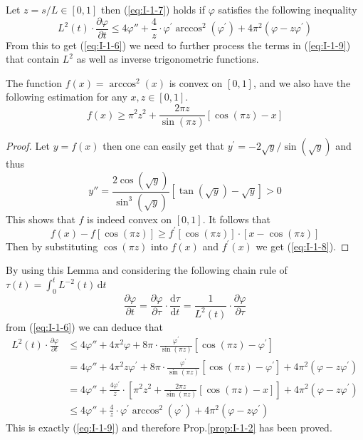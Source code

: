 Let $z=s/L\in[0,1]$ then (\ref{eq:I-1-7}) holds if $\varphi$ satisfies the following inequality
\begin{equation}\label{eq:I-1-9}
    L^2(t)\cdot\frac{\partial\varphi}{\partial t}\le 4\varphi{''}+\frac{4}{z}\cdot\varphi^\prime\arccos^2{(\varphi^\prime)}+4\pi^2(\varphi-z\varphi^\prime)
\end{equation}
From this to get (\ref{eq:I-1-6}) we need to further process the terms in (\ref{eq:I-1-9}) that contain $L^2$ as well as inverse trigonometric functions.
\begin{lemma}\label{lem:I-1-6}
    The function $f(x)=\arccos^2{(x)}$ is convex on $[0,1]$, and we also have the following estimation for any $x,z\in[0,1]$.
    \begin{equation}\label{eq:I-1-8}
        f(x)\ge\pi^2 z^2+\frac{2\pi z}{\sin{(\pi z)}}[\cos{(\pi z)}-x]
    \end{equation}
\end{lemma}
\begin{proof}
    Let $y=f(x)$ then one can easily get that $y^\prime=-2\sqrt{y}/\sin{(\sqrt{y})}$ and thus
    \begin{equation*}
        y{''}=\frac{2\cos{\left(\sqrt{y}\right)}}{\sin^3{\left(\sqrt{y}\right)}}\left[\tan{\left(\sqrt{y}\right)}-\sqrt{y}\right]>0
    \end{equation*}
    This shows that $f$ is indeed convex on $[0,1]$. It follows that
    \begin{equation*}
        f(x)-f\left[\cos{(\pi z)}\right]\ge f^\prime[\cos{(\pi z)}]\cdot\left[x-\cos{(\pi z)}\right]
    \end{equation*}
    Then by substituting $\cos{(\pi z)}$ into $f(x)$ and $f^\prime (x)$ we get (\ref{eq:I-1-8}).
\end{proof}

By using this Lemma and considering the following chain rule of $\tau(t)=\int_{0}^{t}L^{-2}(t)\,\mathrm{d}t$
\begin{equation*}
    \frac{\partial\varphi}{\partial t}=\frac{\partial\varphi}{\partial\tau}\cdot\frac{\mathrm{d}\tau}{\mathrm{d}t}=\frac{1}{L^2(t)}\cdot\frac{\partial\varphi}{\partial\tau}
\end{equation*}
from (\ref{eq:I-1-6}) we can deduce that
\begin{align*}
    L^2(t)\cdot\frac{\partial\varphi}{\partial t}&\le 4\varphi{''}+4\pi^2\varphi+8\pi\cdot\frac{\varphi^\prime}{\sin{(\pi z)}}\left[\cos{(\pi z)-\varphi^\prime}\right]\\
    &=4\varphi{''}+4\pi^2 z\varphi^\prime+8\pi\cdot\frac{\varphi^\prime}{\sin{(\pi z)}}\left[\cos{(\pi z)-\varphi^\prime}\right]+4\pi^2\left(\varphi-z\varphi^\prime\right)\\
    &=4\varphi{''}+\frac{4\varphi^\prime}{z}\cdot\left[\pi^2 z^2+\frac{2\pi z}{\sin{(\pi z)}}[\cos{(\pi z)}-x]\right]+4\pi^2\left(\varphi-z\varphi^\prime\right)\\
    &\le 4\varphi{''}+\frac{4}{z}\cdot\varphi^\prime\arccos^2{(\varphi^\prime)}+4\pi^2(\varphi-z\varphi^\prime)
\end{align*}
This is exactly (\ref{eq:I-1-9}) and therefore Prop.\ref{prop:I-1-2} has been proved.

